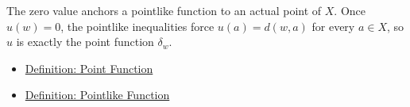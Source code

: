 \begin{remark*}[Interpretation]
The zero value anchors a pointlike function to an actual point of \(X\).  Once
\(u(w)=0\), the pointlike inequalities force \(u(a)=d(w,a)\) for every
\(a\in X\), so \(u\) is exactly the point function \(\delta_w\).
\end{remark*}

\begin{dependencies}
\begin{itemize}
  \item \hyperref[def:metric-point-function]{Definition: Point Function}
  \item \hyperref[def:metric-pointlike-function]{Definition: Pointlike Function}
\end{itemize}
\end{dependencies}
